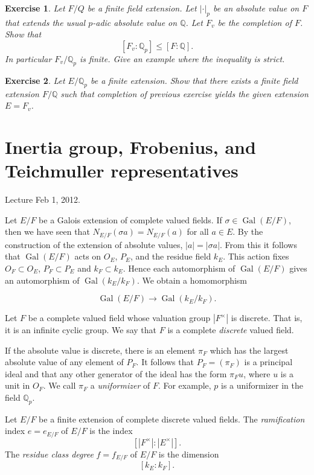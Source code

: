 \documentclass{amsart}
\def\op#1{{\operatorname{#1}}}
\newcommand{\ring}[1]{\mathbb{#1}}
\newtheorem{exercise}{Exercise}
\def\newterm#1{{\it #1}}
\def\abs#1{{|#1|}}
\begin{document}
\begin{exercise}  Let $F/Q$ be a finite field extension.  Let $\abs{\cdot}_p$ be
an absolute value on $F$ that extends the usual $p$-adic absolute value
on $\ring{Q}$.  Let $F_v$ be the completion of $F$.  Show that
\[
[F_v:\ring{Q}_p]\le [F:\ring{Q}].
\]
In particular $F_v/\ring{Q}_p$ is finite.  Give an example where the inequality
is strict.
\end{exercise}

\begin{exercise}  Let $E/\ring{Q}_p$ be a finite extension.  Show that there
exists a finite field extension $F/\ring{Q}$ such that completion of previous
exercise yields the given extension $E=F_v$.
\end{exercise}


\newpage
\section{Inertia group, Frobenius, and Teichmuller representatives}

Lecture Feb 1, 2012.

Let $E/F$ be a Galois extension of complete valued fields.
If $\sigma\in\op{Gal}(E/F)$, then we have seen that $N_{E/F}(\sigma a) = N_{E/F}(a)$
for all $a\in E$.  By the construction of the extension of absolute values,
$\abs{a}=\abs{\sigma{a}}$.  From this it follows that $\op{Gal}(E/F)$
acts on $O_E$, $P_E$, and the residue field $k_E$.
This action fixes $O_F\subset O_E$, $P_F\subset P_E$ and $k_F\subset k_E$.
Hence each automorphism of $\op{Gal}(E/F)$ gives an automorphism of 
$\op{Gal}(k_E/k_F)$.  We obtain a homomorphism

\[
\op{Gal}(E/F)\to \op{Gal}(k_E/k_F).
\]

Let $F$ be a complete valued field whose valuation group $\abs{F^\times}$ is discrete.
That is, it is an infinite cyclic group.
We say that $F$ is a complete \newterm{discrete} valued field.

If the absolute value is discrete, there is an element $\pi_F$ which
has the largest absolute value of any element of $P_F$.  It follows
that $P_F = (\pi_F)$ is a principal ideal and that any other generator
of the ideal has the form $\pi_F u$, where $u$ is a unit in $O_F$.  We
call $\pi_F$ a \newterm{uniformizer} of $F$.  For example, $p$ is a
uniformizer in the field $\ring{Q}_p$.

Let $E/F$ be a finite extension of complete discrete valued fields.
The \newterm{ramification} index $e=e_{E/F}$ of $E/F$ is the index
\[
[\abs{F^\times}:\abs{E^\times}].
\]
The \newterm{residue class degree} $f=f_{E/F}$ of $E/F$ is the dimension
\[
[k_E:k_F].
\]
\end{document}
